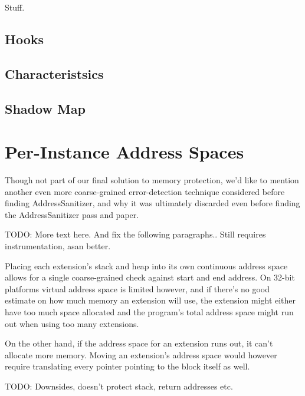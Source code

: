 Stuff.

\subsection {Hooks}

\subsection {Characteristsics}

\subsection {Shadow Map}


\section {Per-Instance Address Spaces}

Though not part of our final solution to memory protection, we'd like to mention
another even more coarse-grained error-detection technique considered before
finding AddressSanitizer, and why it was ultimately discarded even before
finding the AddressSanitizer pass and paper.

TODO: More text here. And fix the following paragraphs.. Still requires
instrumentation, asan better.

Placing each extension's stack and heap into its own continuous address space
allows for a single coarse-grained check against start and end address. On
32-bit platforms virtual address space is limited however, and if there's no
good estimate on how much memory an extension will use, the extension might
either have too much space allocated and the program's total address space
might run out when using too many extensions.

On the other hand, if the address space for an extension runs out, it can't
allocate more memory. Moving an extension's address space would however require
translating every pointer pointing to the block itself as well.

TODO: Downsides, doesn't protect stack, return addresses etc.
